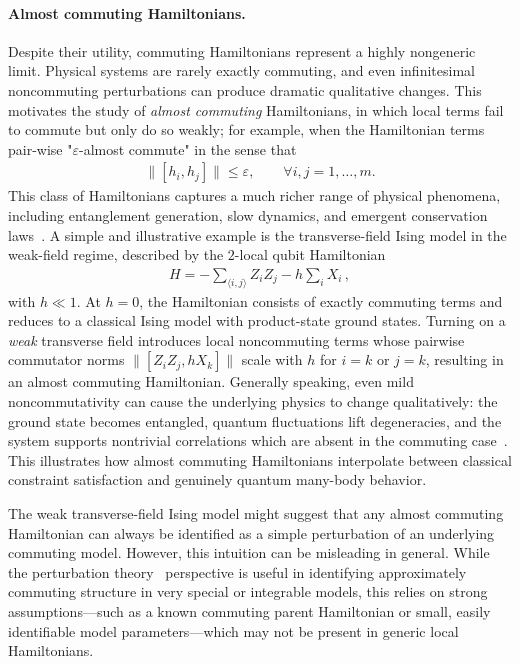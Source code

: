 \documentclass[a4paper,onecolumn,11pt]{quantumarticle}
\theoremstyle{plain}
\newcommand{\eps}{\varepsilon}
\begin{document}
\paragraph{Almost commuting Hamiltonians.}
Despite their utility, commuting Hamiltonians represent a highly nongeneric limit.  Physical systems are rarely exactly commuting, and even infinitesimal noncommuting perturbations can produce dramatic qualitative changes. 
 This motivates the study of \emph{almost commuting} Hamiltonians, in 
 which local terms fail to commute but only do so weakly; for example, when the Hamiltonian terms pair-wise "$\eps$-almost commute" in the sense that
\begin{align}
\|[h_i,h_j]\| \leq \eps, \quad\quad \forall i,j=1,\dots,m.   
\end{align}
This class of Hamiltonians captures a much richer range of physical phenomena, including 
entanglement generation, slow dynamics, and emergent conservation laws~\cite{Sachdev2011,Mbeng_2024}. 
A simple and illustrative example is the transverse-field Ising model 
in the weak-field regime, described by the $2$-local qubit Hamiltonian
\begin{align}\label{eq:ising}
H = -\sum_{\langle i,j \rangle} Z_i Z_j - h \sum_i X_i \, ,
\end{align}
with $h \ll 1$.  At $h=0$, the Hamiltonian consists of exactly 
commuting terms and reduces to a classical Ising model with 
product-state ground states.  Turning on a \emph{weak} transverse field 
introduces local noncommuting terms whose pairwise commutator norms 
$\|[Z_i Z_j,hX_k]\|$
scale with $h$ for $i=k$ or $j=k$, resulting in an almost commuting Hamiltonian. Generally speaking, even
mild noncommutativity can cause the underlying physics to 
change qualitatively: the ground state becomes entangled, quantum fluctuations lift degeneracies, and the system supports nontrivial correlations which are absent in the commuting case~\cite{Mbeng_2024}.  This illustrates how almost commuting Hamiltonians interpolate between classical constraint satisfaction and genuinely quantum many-body behavior.

The weak transverse-field Ising model might suggest that any almost commuting Hamiltonian can always be identified as a simple perturbation of an underlying commuting model. However, this intuition can be misleading in general. While the perturbation theory~\cite{Kato:1966:PTL} perspective is useful in identifying approximately commuting structure in very special or integrable models, this relies on strong assumptions---such as a known commuting parent Hamiltonian or small, easily identifiable model parameters---which may not be present in generic local Hamiltonians. 
\end{document}
